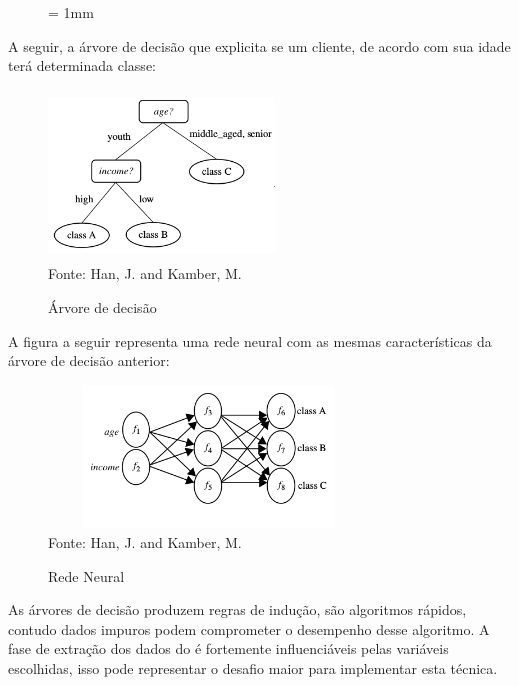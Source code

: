 \begin{figure}[ht] \unitlength= 1mm \thicklines
\end{figure}

\vspace{18mm}
  
A seguir, a árvore de decisão que explicita se um cliente, de acordo com sua idade terá determinada classe:
\begin{figure}[!ht]
\centering
\caption{Árvore de decisão}
\includegraphics[width=60mm, height=45mm]{Figuras/BigData/arvorejovem.png}\\
\tiny Fonte: Han, J. and Kamber, M. 
\end{figure}  

A figura a seguir representa uma rede neural com as mesmas características da árvore de decisão anterior:
\begin{figure}[!ht]
\centering
\caption{Rede Neural}
\includegraphics[width=85mm, height=38mm]{Figuras/BigData/redeneural.png}\\
\tiny Fonte: Han, J. and Kamber, M. 
\end{figure}  

As árvores de decisão produzem regras de indução, são algoritmos rápidos, contudo dados impuros podem comprometer o desempenho desse algoritmo. 
A fase de extração dos dados do é fortemente influenciáveis pelas variáveis escolhidas, \cite{DecisionTree} 
isso pode representar o desafio maior para implementar esta técnica. 

